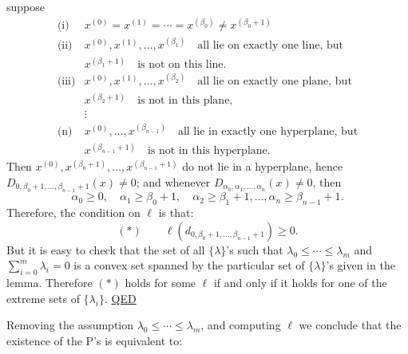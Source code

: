 suppose
\[
\begin{array}{rl}
\text{(i)}&x^{(0)}=x^{(1)}=\cdots=x^{(\beta_0)}\ne x^{(\beta_0+1)}\\[5pt]
\text{(ii)}&x^{(0)},x^{(1)},\ldots,x^{(\beta_1)}
\quad\text{all lie on exactly one line, but}\\
&x^{(\beta_1+1)}\quad\text{is not on this line.}\\[5pt]
\text{(iii)}&x^{(0)},x^{(1)},\ldots,x^{(\beta_2)}
\quad\text{all lie on exactly one plane, but}\\
&x^{(\beta_2+1)}\quad\text{is not in this plane,}\\
&\vdots\\
\text{(n)}&x^{(0)},\ldots,x^{(\beta_{n-1})}
\quad\text{all lie in exactly one hyperplane, but}\\
&x^{(\beta_{n-1}+1)}\quad\text{is not in this hyperplane.}
\end{array}
\]
Then $x^{(0)},x^{(\beta_0+1)},\ldots,x^{(\beta_{n-1}+1)}$
do not lie in a hyperplane, hence
$D_{0,\beta_0+1,\ldots,\beta_{n-1}+1}(x)\ne0$;
and whenever $D_{\alpha_0,\alpha_1,\ldots,\alpha_n}(x)\ne0$, then
\[
\alpha_0\ge0,\quad\alpha_1\ge\beta_0+1,\quad
\alpha_2\ge\beta_1+1,\ldots,\alpha_n\ge\beta_{n-1}+1.
\]
Therefore, the condition on $\ell$ is that:
\[
(*)\qquad\ell(d_{0,\beta_0+1,\ldots,\beta_{n-1}+1})\ge0.
\]
But it is easy to check that the set of all $\{\lambda\}$'s such that
$\lambda_0\le\cdots\le\lambda_m$
and $\displaystyle\sum_{i=0}^m\lambda_i=0$ is a convex set spanned by the particular set of
$\{\lambda\}$'s given in the lemma. Therefore $(*)$ holds for some $\ell$ if and only
if it holds for one of the extreme sets of $\{\lambda_i\}$.
\uline{QED}

Removing the assumption $\lambda_0\le\cdots\le\lambda_m$, and computing $\ell$ we
conclude that the existence of the P's is equivalent to:
